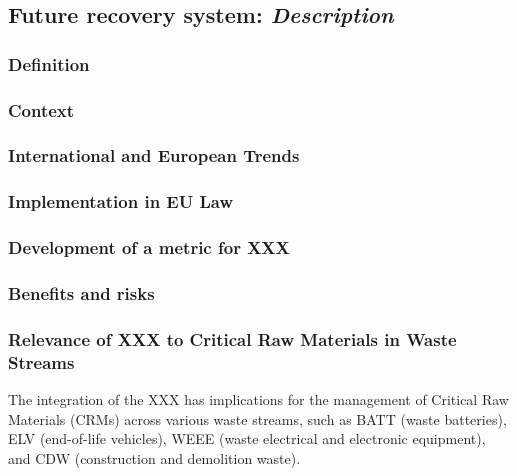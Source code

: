 \subsection{Future recovery system: \textit{Description}}

\subsubsection{Definition}





\subsubsection{Context}


\subsubsection{International and European Trends}

\subsubsection{Implementation in EU Law}


\subsubsection{Development of a metric for XXX}

\subsubsection{Benefits and risks}






\subsubsection{Relevance of XXX to Critical Raw Materials in Waste Streams}

The integration of the XXX has implications for the management of Critical Raw Materials
(CRMs) across various waste streams, such as BATT (waste batteries), ELV
(end-of-life vehicles), WEEE (waste electrical and electronic equipment), and
CDW (construction and demolition waste).

